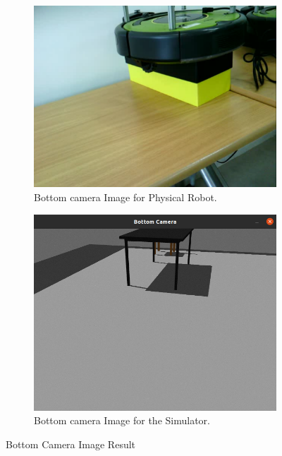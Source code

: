 \documentclass{CSSRforAfrica}
\begin{document}
\begin{figure}[ht]
	  \centering
	  \begin{subfigure}[b]{0.45\linewidth}
		    \includegraphics[width=\linewidth]{images/bottomCamera.png}
		    \caption{Bottom camera Image for Physical Robot.}
		    \label{fig:Physical Bottom camera}
		  \end{subfigure}
	  \hfill
	  \begin{subfigure}[b]{0.45\linewidth}
		    \includegraphics[width=\linewidth]{images/bottomCameraSimulator.png}
		    \caption{Bottom camera Image for the Simulator.}
		    \label{fig:Simulator Bottom camera}
		  \end{subfigure}
	  \caption{Bottom Camera Image Result}
	  \label{fig:Bottom camera test}
\end{figure}
\end{document}
